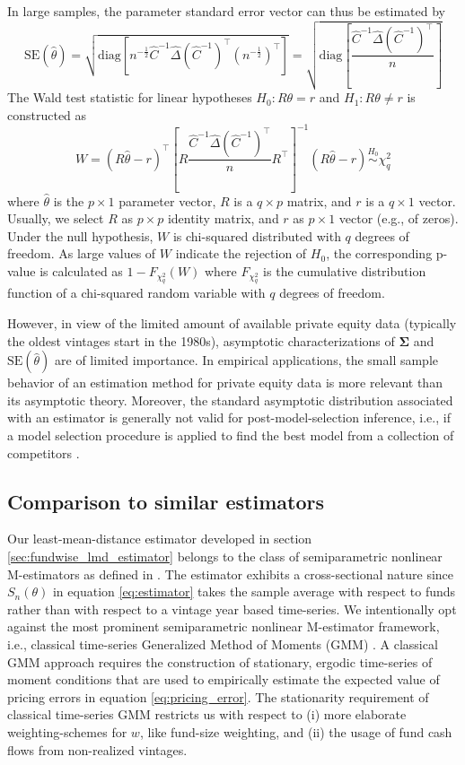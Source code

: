 \documentclass[12pt]{article}
\begin{document}
In large samples, the parameter standard error vector can thus be estimated by
\[
\mathrm{SE}(\hat{\theta}) = 
\sqrt{
	\mathrm{diag} \left[
	n^{-\frac{1}{2}}
	\hat{C}^{-1} \hat{\Delta} (\hat{C}^{-1})^\top
	(n^{-\frac{1}{2}})^\top
	\right] 
}
=
\sqrt{
	\mathrm{diag} \left[
	\frac{\hat{C}^{-1} \hat{\Delta} (\hat{C}^{-1})^\top}{n}
	\right] 
}
\]
The Wald test statistic for linear hypotheses $H_0: R \theta = r$ and $H_1: R \theta \neq r$ is constructed as
\[
W = 
(R \hat{\theta} - r)^\top
\left[
R
\frac{\hat{C}^{-1} \hat{\Delta} (\hat{C}^{-1})^\top}{n}
R^\top
\right]^{-1}
(R \hat{\theta} - r)
\stackrel{H_0}{\sim}
\chi_q^2
\]
where $\hat{\theta}$ is the $p \times 1$ parameter vector, $R$ is a $q \times p$ matrix, and $r$ is a $q \times 1$ vector.
Usually, we select $R$ as $p \times p$ identity matrix, and $r$ as $p \times 1$ vector (e.g., of zeros).
Under the null hypothesis, $W$ is chi-squared distributed with $q$ degrees of freedom. As large values of $W$ indicate the rejection of $H_0$, the corresponding p-value is calculated as $1 - F_{\chi_q^2}(W)$ where $F_{\chi_q^2}$ is the cumulative distribution function of a chi-squared random variable with $q$ degrees of freedom.

However, in view of the limited amount of available private equity data (typically the oldest vintages start in the 1980s), asymptotic characterizations of $\mathbf{\Sigma}$ and $\mathrm{SE}(\hat{\theta})$ are of limited importance. 
In empirical applications, the small sample behavior of an estimation method for private equity data is more relevant than its asymptotic theory.
Moreover, the standard asymptotic distribution associated with an estimator is generally not valid for post-model-selection inference, i.e., if a model selection procedure is applied to find the best model from a collection of competitors \citep{LP05}.


\subsection{Comparison to similar estimators}

Our least-mean-distance estimator developed in section \ref{sec:fundwise_lmd_estimator} belongs to the class of semiparametric nonlinear M-estimators as defined in \cite{PP97}.
The estimator exhibits a cross-sectional nature since $S_n(\theta)$ in equation \ref{eq:estimator} takes the sample average with respect to funds rather than with respect to a vintage year based time-series.
We intentionally opt against the most prominent semiparametric nonlinear M-estimator framework, i.e., classical time-series Generalized Method of Moments (GMM) \citep{H82,H12}.
A classical GMM approach requires the construction of stationary, ergodic time-series of moment conditions that are used to empirically estimate the expected value of pricing errors in equation \ref{eq:pricing_error}.
The stationarity requirement of classical time-series GMM restricts us with respect to (i) more elaborate weighting-schemes for $w$, like fund-size weighting, and (ii) the usage of fund cash flows from non-realized vintages.
\end{document}

